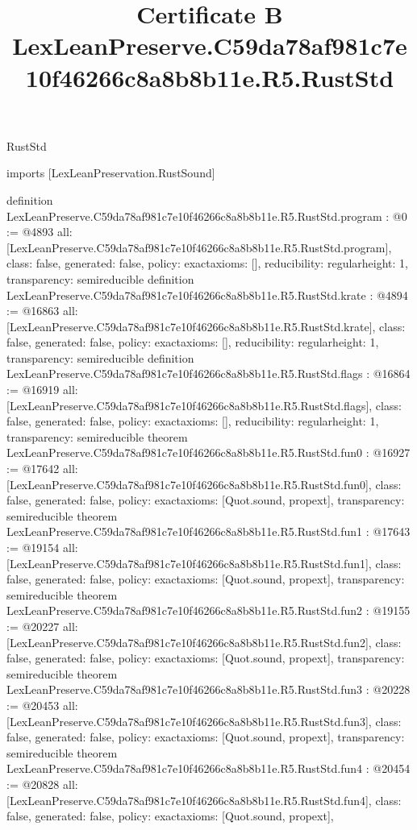 \begin{lexlean}{RustStd}
\title{Certificate B LexLeanPreserve.C59da78af981c7e10f46266c8a8b8b11e.R5.RustStd}
\begin{coremodule}
imports [LexLeanPreservation.RustSound]

definition LexLeanPreserve.C59da78af981c7e10f46266c8a8b8b11e.R5.RustStd.program : @0 := @4893 {
  all: [LexLeanPreserve.C59da78af981c7e10f46266c8a8b8b11e.R5.RustStd.program],
  class: false,
  generated: false,
  policy: exact{axioms: []},
  reducibility: regular{height: 1},
  transparency: semireducible
}
definition LexLeanPreserve.C59da78af981c7e10f46266c8a8b8b11e.R5.RustStd.krate : @4894 := @16863 {
  all: [LexLeanPreserve.C59da78af981c7e10f46266c8a8b8b11e.R5.RustStd.krate],
  class: false,
  generated: false,
  policy: exact{axioms: []},
  reducibility: regular{height: 1},
  transparency: semireducible
}
definition LexLeanPreserve.C59da78af981c7e10f46266c8a8b8b11e.R5.RustStd.flags : @16864 := @16919 {
  all: [LexLeanPreserve.C59da78af981c7e10f46266c8a8b8b11e.R5.RustStd.flags],
  class: false,
  generated: false,
  policy: exact{axioms: []},
  reducibility: regular{height: 1},
  transparency: semireducible
}
theorem LexLeanPreserve.C59da78af981c7e10f46266c8a8b8b11e.R5.RustStd.fun0 : @16927 := @17642 {
  all: [LexLeanPreserve.C59da78af981c7e10f46266c8a8b8b11e.R5.RustStd.fun0],
  class: false,
  generated: false,
  policy: exact{axioms: [Quot.sound, propext]},
  transparency: semireducible
}
theorem LexLeanPreserve.C59da78af981c7e10f46266c8a8b8b11e.R5.RustStd.fun1 : @17643 := @19154 {
  all: [LexLeanPreserve.C59da78af981c7e10f46266c8a8b8b11e.R5.RustStd.fun1],
  class: false,
  generated: false,
  policy: exact{axioms: [Quot.sound, propext]},
  transparency: semireducible
}
theorem LexLeanPreserve.C59da78af981c7e10f46266c8a8b8b11e.R5.RustStd.fun2 : @19155 := @20227 {
  all: [LexLeanPreserve.C59da78af981c7e10f46266c8a8b8b11e.R5.RustStd.fun2],
  class: false,
  generated: false,
  policy: exact{axioms: [Quot.sound, propext]},
  transparency: semireducible
}
theorem LexLeanPreserve.C59da78af981c7e10f46266c8a8b8b11e.R5.RustStd.fun3 : @20228 := @20453 {
  all: [LexLeanPreserve.C59da78af981c7e10f46266c8a8b8b11e.R5.RustStd.fun3],
  class: false,
  generated: false,
  policy: exact{axioms: [Quot.sound, propext]},
  transparency: semireducible
}
theorem LexLeanPreserve.C59da78af981c7e10f46266c8a8b8b11e.R5.RustStd.fun4 : @20454 := @20828 {
  all: [LexLeanPreserve.C59da78af981c7e10f46266c8a8b8b11e.R5.RustStd.fun4],
  class: false,
  generated: false,
  policy: exact{axioms: [Quot.sound, propext]},
}
\end{coremodule}
\end{lexlean}

